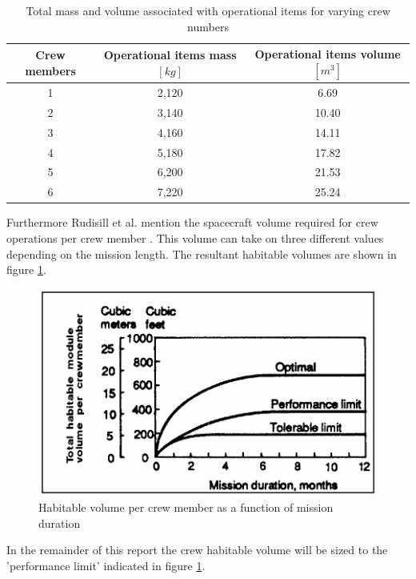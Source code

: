 \begin{table}[h]
	\caption{Total mass and volume associated with operational items for varying crew numbers}
	\begin{tabular}{|c|c|c|}
		\hline
		\textbf{Crew members} & \textbf{Operational items mass $[kg]$} & \textbf{Operational items volume $[m^{3}]$}\\ \hline \hline
		1 & 2,120 & 6.69\\
		2 & 3,140 & 10.40\\
		3 & 4,160 & 14.11\\
		4 & 5,180 & 17.82\\
		5 & 6,200 & 21.53\\
		6 & 7,220 & 25.24\\ \hline
	\end{tabular}
	\label{tab:crewmemberops}
\end{table}
Furthermore Rudisill et al. mention the spacecraft volume required for crew operations per crew member \cite{Rudisill2008}. This volume can take on three different values depending on the mission length. The resultant habitable volumes are shown in figure \ref{fig:crewvolume}.
\begin{figure}[h]
	\centering
	\includegraphics[scale=1.0]{./Figure/CrewModule/Crewvolume}
	\caption{Habitable volume per crew member as a function of mission duration \cite{Rudisill2008}}
	\label{fig:crewvolume}
\end{figure}
In the remainder of this report the crew habitable volume will be sized to the 'performance limit' indicated in figure \ref{fig:crewvolume}.